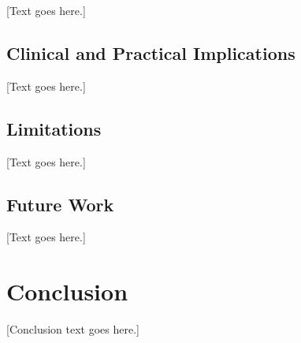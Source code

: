 \documentclass[12pt, a4paper]{article}
\begin{document}
[Text goes here.]

\subsection{Clinical and Practical Implications}

[Text goes here.]

\subsection{Limitations}

[Text goes here.]

\subsection{Future Work}

[Text goes here.]

\section{Conclusion}

[Conclusion text goes here.]

\newpage
\singlespacing
\printbibliography[title={References}]

\newpage
\appendix
\doublespacing
\end{document}
